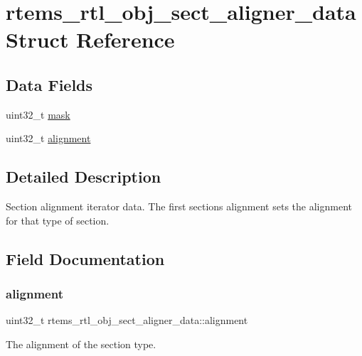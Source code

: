 \hypertarget{structrtems__rtl__obj__sect__aligner__data}{}\section{rtems\+\_\+rtl\+\_\+obj\+\_\+sect\+\_\+aligner\+\_\+data Struct Reference}
\label{structrtems__rtl__obj__sect__aligner__data}
\subsection*{Data Fields}
\begin{DoxyCompactItemize}
\item 
uint32\+\_\+t \mbox{\hyperlink{structrtems__rtl__obj__sect__aligner__data_a0fa01e58b242ee518c1006004c46ba2c}{mask}}
\item 
uint32\+\_\+t \mbox{\hyperlink{structrtems__rtl__obj__sect__aligner__data_a752a1f88eb59aa96d909e1820a4c0b86}{alignment}}
\end{DoxyCompactItemize}


\subsection{Detailed Description}
Section alignment iterator data. The first section\textquotesingle{}s alignment sets the alignment for that type of section. 

\subsection{Field Documentation}
\mbox{\label{structrtems__rtl__obj__sect__aligner__data_a752a1f88eb59aa96d909e1820a4c0b86}} 
\subsubsection{\texorpdfstring{alignment}{alignment}}
{\footnotesize\ttfamily uint32\+\_\+t rtems\+\_\+rtl\+\_\+obj\+\_\+sect\+\_\+aligner\+\_\+data\+::alignment}

The alignment of the section type. \mbox{\label{structrtems__rtl__obj__sect__aligner__data_a0fa01e58b242ee518c1006004c46ba2c}} 
